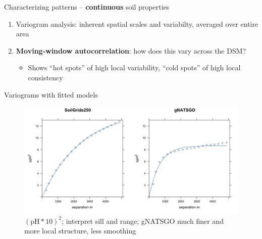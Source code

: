 \documentclass[aspectratio=169, 10pt]{beamer}
\begin{document}
\begin{frame}{Characterizing patterns -- \textbf{continuous} soil properties}
    \begin{enumerate}
        \item \textnormal{Variogram analysis}: inherent spatial scales and variabilty, averaged over entire area
        \item \textbf{Moving-window autocorrelation}: how does this vary across the DSM?
          \begin{itemize}
          \item Shows ``hot spots'' of high local variability, ``cold spots'' of high local consistency
          \end{itemize}
    \end{enumerate}
\end{frame}

\begin{frame}{Variograms with fitted models}
    \begin{figure}
        \centering
        \includegraphics[height=0.6\textheight]{./graphics_david/variograms.png}
        \\${(\mathrm{pH} * 10)}^2$; interpret sill and range; gNATSGO much finer and more local structure, less smoothing
    \end{figure}
\end{frame}


% 

\end{document}

